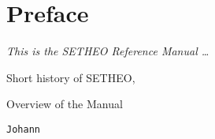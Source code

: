 %
%
\chapter*{Preface}
\thispagestyle{empty}

{\it This is the SETHEO Reference Manual \ldots}

\vspace*{0.8cm}

Short history of SETHEO,

Overview of the Manual

{\tt Johann}

